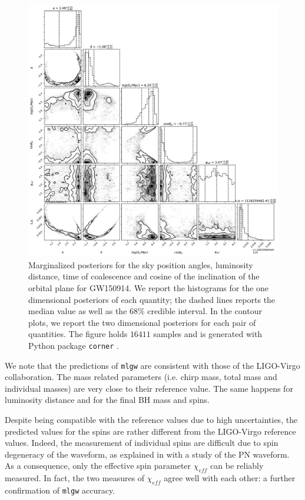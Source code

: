 \begin{figure}
	\centering
    \includegraphics[width=.75\linewidth, trim = {3cm 0cm 3cm 0cm}]{img/extrinsic.pdf}
	\caption{
Marginalized posteriors for the sky position angles, luminosity distance, time of coalescence and cosine of the inclination of the orbital plane for GW150914. We report the histograms for the one dimensional posteriors of each quantity; the dashed lines reports the median value as well as the $68\%$ credible interval.
In the contour plots, we report the two dimensional posteriors for each pair of quantities.
The figure holds $16411$ samples and is generated with Python package \texttt{corner} \cite{pycorner}.
}
	\label{fig:PDF_BBH_extrinsic}
\end{figure}
We note that the predictions of \texttt{mlgw} are consistent with those of the LIGO-Virgo collaboration.
The mass related parameters (i.e. chirp mass, total mass and individual masses) are very close to their reference value.
The same happens for luminosity distance and for the final BH mass and spins.
\par
Despite being compatible with the reference values due to high uncertainties, the predicted values for the spins are rather different from the LIGO-Virgo reference values.
Indeed, the measurement of individual spins are difficult due to spin degeneracy of the waveform, as explained in \cite{Baird2013spin_degeneracy} \cite{Purrer2015meas_spin_deg} with a study of the PN waveform.
As a consequence, only the effective spin parameter $\chi_{eff}$ can be reliably measured.
In fact, the two measures of $\chi_{eff}$ agree well with each other: a further confirmation of \texttt{mlgw} accuracy.
